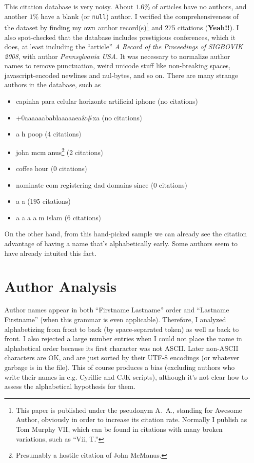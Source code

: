 \documentclass[twocolumn]{article}
\begin{document}
This citation database is very noisy. About $1.6\%$ of articles have
no authors, and another $1\%$ have a blank (or {\tt null}) author. I
verified the comprehensiveness of the dataset by finding my own author
record(s)\footnote{This paper is published under the pseudonym A.~A.,
  standing for Awesome Author, obviously in order to increase its
  citation rate. Normally I publish as Tom Murphy VII, which can be
  found in citations with many broken variations, such as ``Vii, T.''}
and 275 citations ({\bf Yeah!!}). I also spot-checked that the database
includes prestigious conferences, which it does, at least including
the ``article'' {\em A Record of the Proceedings of SIGBOVIK 2008},
with author {\em Pennsylvania USA}. It was necessary to normalize
author names to remove punctuation, weird unicode stuff like non-breaking
spaces, javascript-encoded newlines and nul-bytes, and so on. There
are many strange authors in the database, such as
\begin{itemize}
\item capinha para celular horizonte artificial iphone \quad(no citations)
\item +0aaaaaabablaaaaaea\&\#xa \quad(no citations)
\item a h poop \quad(4 citations)
\item john mcm anus\footnote{Presumably a hostile citation of John McManus.} \quad(2 citations)
\item coffee hour \quad(0 citations)
\item nominate com registering dad domains since \quad(0 citations)
\item a a \quad(195 citations)
\item a a a a m islam \quad(6 citations)
\end{itemize}

On the other hand, from this hand-picked sample we can already see the
citation advantage of having a name that's alphabetically early. Some
authors seem to have already intuited this fact.

\section{Author Analysis} \label{sec:authoranalysis}

Author names appear in both ``Firstname Lastname'' order and
``Lastname Firstname'' (when this grammar is even applicable).
Therefore, I analyzed alphabetizing from front to back (by
space-separated token) as well as back to front. I also rejected a
large number entries when I could not place the name in alphabetical
order because its first character was not ASCII. Later non-ASCII
characters are OK, and are just sorted by their UTF-8 encodings (or
whatever garbage is in the file). This of course produces a bias
(excluding authors who write their names in e.g. Cyrillic and CJK
scripts), although it's not clear how to assess the alphabetical
hypothesis for them.
\end{document}
